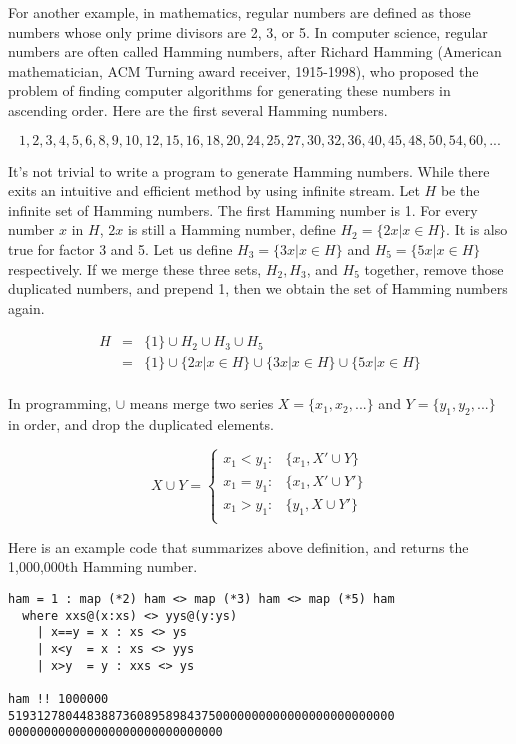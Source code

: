 \documentclass{article}
\begin{document}
 
For another example, in mathematics, regular numbers are defined as those numbers whose only prime divisors are 2, 3, or 5. In computer science, regular numbers are often called Hamming numbers, after Richard Hamming (American mathematician, ACM Turning award receiver, 1915-1998), who proposed the problem of finding computer algorithms for generating these numbers in ascending order. Here are the first several Hamming numbers.

\[
1, 2, 3, 4, 5, 6, 8, 9, 10, 12, 15, 16, 18, 20, 24, 25, 27, 30, 32, 36, 40, 45, 48, 50, 54, 60, ...
\]

It's not trivial to write a program to generate Hamming numbers. While there exits an intuitive and efficient method by using infinite stream. Let $H$ be the infinite set of Hamming numbers. The first Hamming number is 1. For every number $x$ in $H$, $2x$ is still a Hamming number, define $H_2 = \{ 2x | x \in H \}$. It is also true for factor 3 and 5. Let us define $H_3 = \{ 3x | x \in H \}$ and $H_5 = \{ 5x | x \in H \}$ respectively. If we merge these three sets, $H_2, H_3$, and $H_5$ together, remove those duplicated numbers, and prepend 1, then we obtain the set of Hamming numbers again.

\[
\begin{array}{rcl}
H & = & \{ 1 \} \cup H_2 \cup H_3 \cup H_5 \\
  & = & \{ 1 \} \cup \{ 2x | x \in H \} \cup \{ 3x | x \in H \} \cup \{ 5x | x \in H \} \\
\end{array}
\]

In programming, $\cup$ means merge two series $X = \{x_1, x_2, ...\}$ and $Y = \{y_1, y_2, ...\}$ in order, and drop the duplicated elements.

\[
X \cup Y =
\begin{cases}
x_1 < y_1 : & \{x_1, X' \cup Y \} \\
x_1 = y_1 : & \{x_1, X' \cup Y' \} \\
x_1 > y_1 : & \{y_1, X \cup Y' \} \\
\end{cases}
\]

Here is an example code that summarizes above definition, and returns the 1,000,000th Hamming number.

\begin{lstlisting}
ham = 1 : map (*2) ham <> map (*3) ham <> map (*5) ham
  where xxs@(x:xs) <> yys@(y:ys)
    | x==y = x : xs <> ys
    | x<y  = x : xs <> yys
    | x>y  = y : xxs <> ys

ham !! 1000000
519312780448388736089589843750000000000000000000000000
000000000000000000000000000000
\end{lstlisting}
\end{document}
